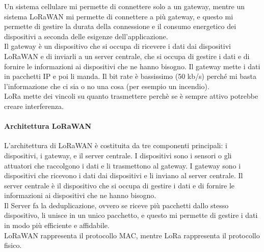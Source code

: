 Un sistema cellulare mi permette di connettere solo a un gateway, mentre un sistema LoRaWAN mi permette di connettere a più gateway, e questo mi permette di gestire la durata della connessione e il consumo energetico dei dispositivi a seconda delle esigenze dell'applicazione.\\

Il gateway è un dispositivo che si occupa di ricevere i dati dai dispositivi LoRaWAN e di inviarli a un server centrale, che si occupa di gestire i dati e di fornire le informazioni ai dispositivi che ne hanno bisogno. Il gateway mette i dati in pacchetti IP e poi li manda. Il bit rate è bassissimo (50 kb/s) perché mi basta l'informazione che ci sia o no una cosa (per esempio un incendio).\\
LoRa mette dei vincoli su quanto trasmettere perchè se è sempre attivo potrebbe creare interferenza.\\

\paragraph{Architettura LoRaWAN}
L'architettura di LoRaWAN è costituita da tre componenti principali: i dispositivi, i gateway, e il server centrale. I dispositivi sono i sensori o gli attuatori che raccolgono i dati e li trasmettono al gateway. I gateway sono i dispositivi che ricevono i dati dai dispositivi e li inviano al server centrale. Il server centrale è il dispositivo che si occupa di gestire i dati e di fornire le informazioni ai dispositivi che ne hanno bisogno.\\
Il Server fa la deduplicazione, ovvero se riceve più pacchetti dallo stesso dispositivo, li unisce in un unico pacchetto, e questo mi permette di gestire i dati in modo più efficiente e affidabile.\\

LoRaWAN rappresenta il protocollo MAC, mentre LoRa rappresenta il protocollo fisico.\\
